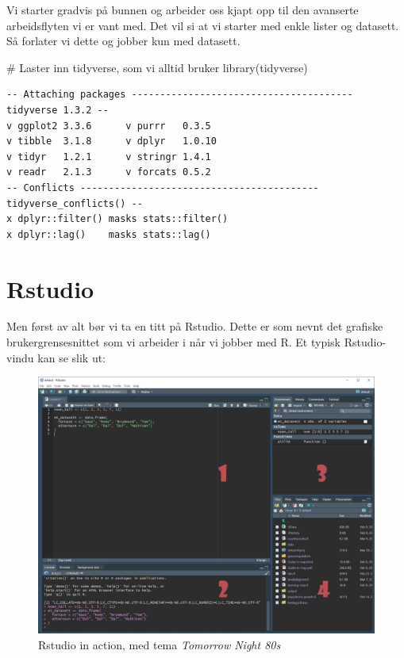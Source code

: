 \documentclass[
  letterpaper,
  DIV=11,
  numbers=noendperiod]{scrreprt}
\newenvironment{Shaded}{\begin{snugshade}}{\end{snugshade}}
\newcommand{\CommentTok}[1]{\textcolor[rgb]{0.37,0.37,0.37}{#1}}
\newcommand{\FunctionTok}[1]{\textcolor[rgb]{0.28,0.35,0.67}{#1}}
\newcommand{\NormalTok}[1]{\textcolor[rgb]{0.00,0.23,0.31}{#1}}
\begin{document}
Vi starter gradvis på bunnen og arbeider oss kjapt opp til den avanserte
arbeidsflyten vi er vant med. Det vil si at vi starter med enkle lister
og datasett. Så forlater vi dette og jobber kun med datasett.

\begin{Shaded}
\begin{Highlighting}[]
\CommentTok{\# Laster inn tidyverse, som vi alltid bruker}
\FunctionTok{library}\NormalTok{(tidyverse)}
\end{Highlighting}
\end{Shaded}

\begin{verbatim}
-- Attaching packages --------------------------------------- tidyverse 1.3.2 --
v ggplot2 3.3.6      v purrr   0.3.5 
v tibble  3.1.8      v dplyr   1.0.10
v tidyr   1.2.1      v stringr 1.4.1 
v readr   2.1.3      v forcats 0.5.2 
-- Conflicts ------------------------------------------ tidyverse_conflicts() --
x dplyr::filter() masks stats::filter()
x dplyr::lag()    masks stats::lag()
\end{verbatim}

\hypertarget{sec-rstudio}{%
\section{Rstudio}\label{sec-rstudio}}

Men først av alt bør vi ta en titt på Rstudio. Dette er som nevnt det
grafiske brukergrensesnittet som vi arbeider i når vi jobber med R. Et
typisk Rstudio-vindu kan se slik ut:

\begin{figure}

{\centering \includegraphics{./img/rstudio_annotated.PNG}

}

\caption{Rstudio in action, med tema \emph{Tomorrow Night 80s}}

\end{figure}
\end{document}
